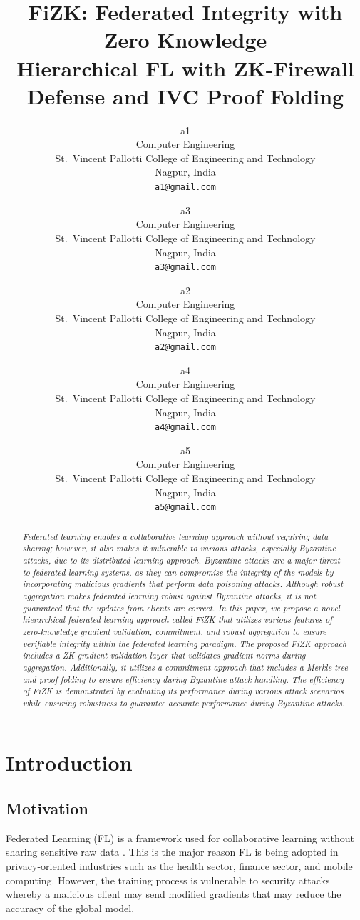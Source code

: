 \documentclass[10pt,twocolumn,letterpaper]{article}
\title{FiZK: Federated Integrity with Zero Knowledge\\
Hierarchical FL with ZK-Firewall Defense and IVC Proof Folding}
\author{a1\\
Computer Engineering\\
St.\ Vincent Pallotti College of Engineering and Technology\\
Nagpur, India\\
{\tt\small a1@gmail.com}
\and
a3\\
Computer Engineering\\
St.\ Vincent Pallotti College of Engineering and Technology\\
Nagpur, India\\
{\tt\small a3@gmail.com}
\and
a2\\
Computer Engineering\\
St.\ Vincent Pallotti College of Engineering and Technology\\
Nagpur, India\\
{\tt\small a2@gmail.com}
\and
a4\\
Computer Engineering\\
St.\ Vincent Pallotti College of Engineering and Technology\\
Nagpur, India\\
{\tt\small a4@gmail.com}
\and
a5\\
Computer Engineering\\
St.\ Vincent Pallotti College of Engineering and Technology\\
Nagpur, India\\
{\tt\small a5@gmail.com}
}
\begin{document}
\maketitle

\begin{abstract}

\itshape
Federated learning enables a collaborative learning approach without requiring data sharing; however, it also makes it vulnerable to various attacks, especially Byzantine attacks, due to its distributed learning approach. Byzantine attacks are a major threat to federated learning systems, as they can compromise the integrity of the models by incorporating malicious gradients that perform data poisoning attacks. Although robust aggregation makes federated learning robust against Byzantine attacks, it is not guaranteed that the updates from clients are correct. In this paper, we propose a novel hierarchical federated learning approach called FiZK that utilizes various features of zero-knowledge gradient validation, commitment, and robust aggregation to ensure verifiable integrity within the federated learning paradigm. The proposed FiZK approach includes a ZK gradient validation layer that validates gradient norms during aggregation. Additionally, it utilizes a commitment approach that includes a Merkle tree and proof folding to ensure efficiency during Byzantine attack handling. The efficiency of FiZK is demonstrated by evaluating its performance during various attack scenarios while ensuring robustness to guarantee accurate performance during Byzantine attacks.
\end{abstract}


\section{Introduction}
\label{sec:intro}

\subsection{Motivation}

Federated Learning (FL) is a framework used for collaborative learning without sharing sensitive raw data \cite{li2020federated,kairouz2021advances}. This is the major reason FL is being adopted in privacy-oriented industries such as the health sector, finance sector, and mobile computing. However, the training process is vulnerable to security attacks whereby a malicious client may send modified gradients that may reduce the accuracy of the global model.
\end{document}
